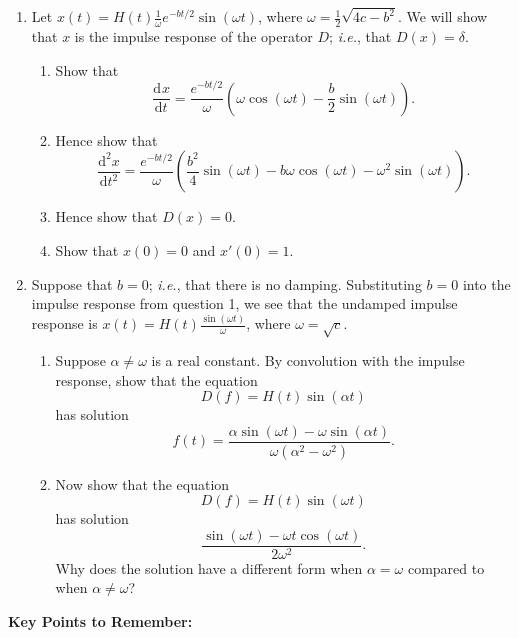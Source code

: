 \documentclass{article}
\newcommand{\deriv}[3][]{\frac{\mathrm{d}^{#1}#2}{\mathrm{d}#3^{#1}}}
\begin{document}
\begin{enumerate}
	\item Let $x(t)=H(t)\frac{1}{\omega}e^{-bt/2}\sin(\omega t)$, where $\omega = \frac{1}{2}\sqrt{4c-b^2}$. We will show that $x$ is the impulse response of the operator $D$; \textit{i.e.}, that $D(x)=\delta$.
		\begin{enumerate}
			\item Show that
				\[\deriv{x}{t}=\frac{e^{-bt/2}}{\omega}\left(\omega \cos(\omega t) - \frac{b}{2}\sin(\omega t)\right).\]
			\item Hence show that
				\[\deriv[2]{x}{t} = \frac{e^{-bt/2}}{\omega}\left(\frac{b^2}{4}\sin(\omega t) -b\omega\cos(\omega t) -\omega^2\sin(\omega t)\right).\]
			\item Hence show that $D(x)=0$.
			\item Show that $x(0)=0$ and $x'(0)=1$.
		\end{enumerate}
	\item Suppose that $b=0$; \textit{i.e.}, that there is no damping. Substituting $b=0$ into the impulse response from question 1, we see that the undamped impulse response is $x(t)=H(t)\frac{\sin(\omega t)}{\omega}$, where $\omega=\sqrt{c}$.
		\begin{enumerate}
			\item Suppose $\alpha\neq \omega$ is a real constant. By convolution with the impulse response, show that the equation
				\[D(f)=H(t)\sin(\alpha t)\]
				has solution
				\[f(t)=\frac{\alpha\sin(\omega t)-\omega\sin(\alpha t)}{\omega(\alpha^2-\omega^2)}.\]
			\item Now show that the equation
				\[D(f)=H(t)\sin(\omega t)\]
				has solution
				\[\frac{\sin(\omega t) - \omega t\cos(\omega t)}{2\omega^2}.\]
				Why does the solution have a different form when $\alpha=\omega$ compared to when $\alpha\neq \omega$?
		\end{enumerate}
\end{enumerate}






\clearpage




{\bf Key Points to Remember:}

\vspace{5mm}
\end{document}

